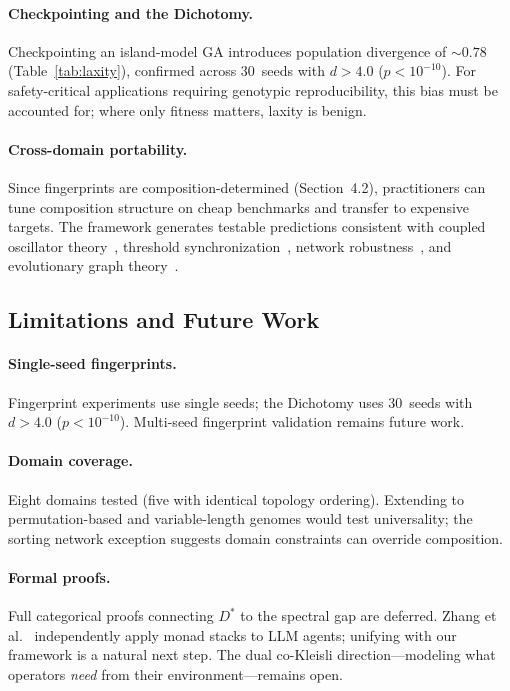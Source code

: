 \documentclass[sigconf]{acmart}
\begin{document}
\paragraph{Checkpointing and the Dichotomy.}
Checkpointing an island-model GA introduces population divergence of ${\sim}0.78$ (Table~\ref{tab:laxity}), confirmed across 30~seeds with $d > 4.0$ ($p < 10^{-10}$). For safety-critical applications requiring genotypic reproducibility, this bias must be accounted for; where only fitness matters, laxity is benign.

\paragraph{Cross-domain portability.}
Since fingerprints are composition-determined (Section~4.2), practitioners can tune composition structure on cheap benchmarks and transfer to expensive targets. The framework generates testable predictions consistent with coupled oscillator theory~\cite{sanz2026algebraic}, threshold synchronization~\cite{wu2025threshold}, network robustness~\cite{ostilli2025topological}, and evolutionary graph theory~\cite{brewster2025evolutionary}.

\subsection{Limitations and Future Work}
\label{sec:limitations}

\paragraph{Single-seed fingerprints.}
Fingerprint experiments use single seeds; the Dichotomy uses 30~seeds with $d > 4.0$ ($p < 10^{-10}$). Multi-seed fingerprint validation remains future work.

\paragraph{Domain coverage.}
Eight domains tested (five with identical topology ordering). Extending to permutation-based and variable-length genomes would test universality; the sorting network exception suggests domain constraints can override composition.

\paragraph{Formal proofs.}
Full categorical proofs connecting $D^*$ to the spectral gap are deferred. Zhang et al.~\cite{zhang2025monadic} independently apply monad stacks to LLM agents; unifying with our framework is a natural next step. The dual co-Kleisli direction---modeling what operators \emph{need} from their environment---remains open.
\end{document}
